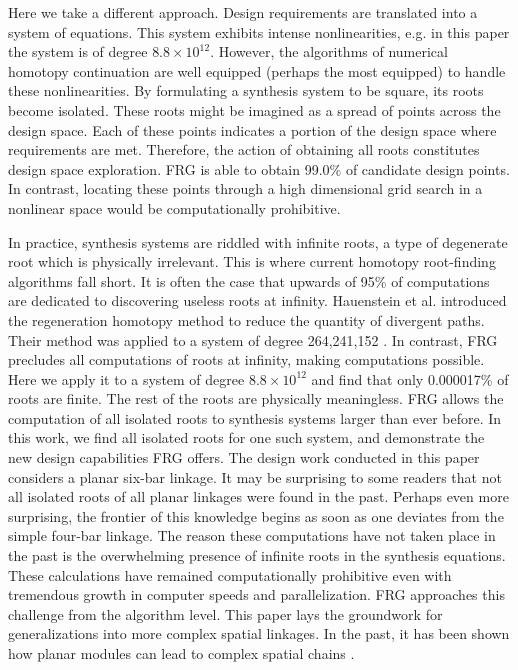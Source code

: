\documentclass[journal]{IEEEtran}
\begin{document}
Here we take a different approach.
Design requirements are translated into a system of equations.
This system exhibits intense nonlinearities, e.g. in this paper the system is of degree $8.8\times 10^{12}$.
However, the algorithms of numerical homotopy continuation are well equipped (perhaps the most equipped) to handle these nonlinearities.
By formulating a synthesis system to be square, its roots become isolated.
These roots might be imagined as a spread of points across the design space.
Each of these points indicates a portion of the design space where requirements are met.
Therefore, the action of obtaining all roots constitutes design space exploration.
FRG is able to obtain 99.0\% of candidate design points.
In contrast, locating these points through a high dimensional grid search in a nonlinear space would be computationally prohibitive.

In practice, synthesis systems are riddled with infinite roots, a type of degenerate root which is physically irrelevant.
This is where current homotopy root-finding algorithms fall short.
It is often the case that upwards of 95\% of computations are dedicated to discovering useless roots at infinity.
Hauenstein et al. \cite{hauensteinRegenerationHomotopiesSolving2011} introduced the regeneration homotopy method to reduce the quantity of divergent paths.
Their method was applied to a system of degree 264,241,152 \cite{plecnikComputationalDesignStephenson2015}.
In contrast, FRG precludes all computations of roots at infinity, making computations possible.
Here we apply it to a system of degree $8.8\times 10^{12}$ and find that only 0.000017\% of roots are finite.
The rest of the roots are physically meaningless.
FRG allows the computation of all isolated roots to synthesis systems larger than ever before.
In this work, we find all isolated roots for one such system, and demonstrate the new design capabilities FRG offers.
The design work conducted in this paper considers a planar six-bar linkage.
It may be surprising to some readers that not all isolated roots of all planar linkages were found in the past.
Perhaps even more surprising, the frontier of this knowledge begins as soon as one deviates from the simple four-bar linkage.
The reason these computations have not taken place in the past is the overwhelming presence of infinite roots in the synthesis equations.  
These calculations have remained computationally prohibitive even with tremendous growth in computer speeds and parallelization.  
FRG approaches this challenge from the algorithm level.
This paper lays the groundwork for generalizations into more complex spatial linkages.  
In the past, it has been shown how planar modules can lead to complex spatial chains \cite{plecnikControllingMovementTRR2016}.
\end{document}
